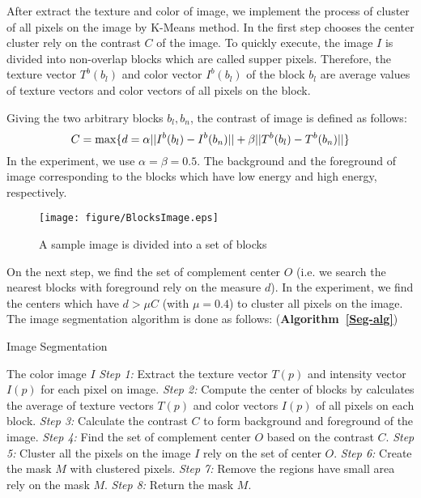 \documentclass{amcs}
\begin{document}
After extract the texture and color of image, we implement the process of cluster of all pixels on the image by K-Means method. In the first step chooses the center cluster rely on the contrast $C$ of the image. To quickly execute, the image $I$ is divided into non-overlap blocks which are called supper pixels. Therefore, the texture vector ${T^b}({b_l})$ and color vector ${I^b}({b_l})$ of the block ${b_l}$ are average values of texture vectors and color vectors of all pixels on the block. 
\begin{definition}{} Giving the two arbitrary blocks ${b_l},{b_n}$, the contrast of image is defined as follows:
\begin{equation}
\footnotesize C = \max \{ d = \alpha ||{I^b}({b_l}) - {I^b}({b_n})|| + \beta ||{T^b}({b_l}) - {T^b}({b_n})||\}
\label{eq:contrast}
\end{equation}
In the experiment, we use $\alpha  = \beta  = 0.5$. The background and the foreground of image corresponding to the blocks which have low energy and high energy, respectively.
\label{Contrast-def}
\end{definition}

\begin{figure}[!ht]
	\centering
		\texttt{[image: figure/BlocksImage.eps]}
		\caption{A sample image is divided into a set of blocks}
		\label{block-fig}
\end{figure}

On the next step, we find the set of complement center $O$ (i.e. we search the nearest blocks with foreground rely on the measure $d$). In the experiment, we find the centers which have $d > \mu C$ (with $\mu  = 0.4$) to cluster all pixels on the image. The image segmentation algorithm is done as follows: (\textbf{Algorithm~\ref{Seg-alg}})

\begin{algorithm}[!ht]
\caption{Image Segmentation}
\label{Seg-alg}
\begin{algorithmic}[1]
\REQUIRE The color image $I$
\STATE \textit{Step 1:} Extract the texture vector $T(p)$ and intensity vector $I(p)$ for each pixel on image.
\STATE \textit{Step 2:} Compute the center of blocks by calculates the average of texture vectors $T(p)$ and color vectors $I(p)$ of all pixels on each block.
\STATE \textit{Step 3:} Calculate the contrast $C$ to form background and foreground of the image.
\STATE \textit{Step 4:} Find the set of complement center $O$ based on the contrast $C$.
\STATE \textit{Step 5:} Cluster all the pixels on the image $I$ rely on the set of center $O$.
\STATE \textit{Step 6:} Create the mask $M$ with clustered pixels.
\STATE \textit{Step 7:} Remove the regions have small area rely on the mask $M$.
\STATE \textit{Step 8:} Return the mask $M$.
\end{algorithmic}
\end{algorithm}
\end{document}
